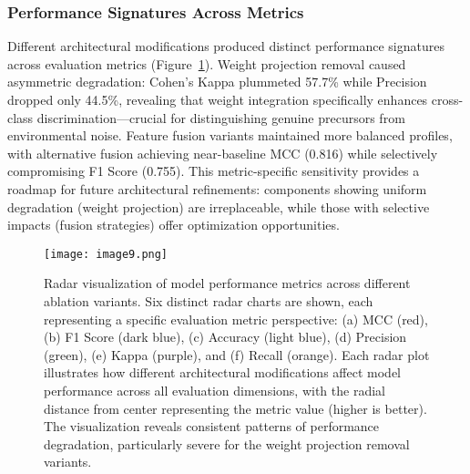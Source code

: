 \documentclass[fleqn,10pt]{wlscirep_mdpi_style}
\begin{document}
\subsubsection{Performance Signatures Across Metrics}
Different architectural modifications produced distinct performance signatures across evaluation metrics (Figure~\ref{fig:fig9}). Weight projection removal caused asymmetric degradation: Cohen's Kappa plummeted 57.7\% while Precision dropped only 44.5\%, revealing that weight integration specifically enhances cross-class discrimination—crucial for distinguishing genuine precursors from environmental noise. Feature fusion variants maintained more balanced profiles, with alternative fusion achieving near-baseline MCC (0.816) while selectively compromising F1 Score (0.755). This metric-specific sensitivity provides a roadmap for future architectural refinements: components showing uniform degradation (weight projection) are irreplaceable, while those with selective impacts (fusion strategies) offer optimization opportunities.

\begin{figure}[!htbp]
\centering
\texttt{[image: image9.png]}
\caption{Radar visualization of model performance metrics across different ablation variants. Six distinct radar charts are shown, each representing a specific evaluation metric perspective: (a) MCC (red), (b) F1 Score (dark blue), (c) Accuracy (light blue), (d) Precision (green), (e) Kappa (purple), and (f) Recall (orange). Each radar plot illustrates how different architectural modifications affect model performance across all evaluation dimensions, with the radial distance from center representing the metric value (higher is better). The visualization reveals consistent patterns of performance degradation, particularly severe for the weight projection removal variants.}
\label{fig:fig9}
\end{figure}
\end{document}
